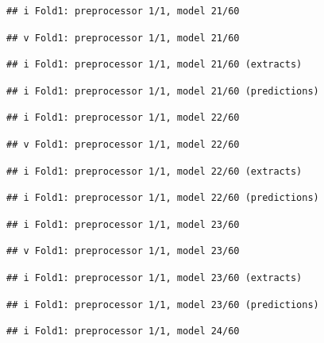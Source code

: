 \documentclass[
]{article}
\begin{document}
\begin{verbatim}
## i Fold1: preprocessor 1/1, model 21/60
\end{verbatim}

\begin{verbatim}
## v Fold1: preprocessor 1/1, model 21/60
\end{verbatim}

\begin{verbatim}
## i Fold1: preprocessor 1/1, model 21/60 (extracts)
\end{verbatim}

\begin{verbatim}
## i Fold1: preprocessor 1/1, model 21/60 (predictions)
\end{verbatim}

\begin{verbatim}
## i Fold1: preprocessor 1/1, model 22/60
\end{verbatim}

\begin{verbatim}
## v Fold1: preprocessor 1/1, model 22/60
\end{verbatim}

\begin{verbatim}
## i Fold1: preprocessor 1/1, model 22/60 (extracts)
\end{verbatim}

\begin{verbatim}
## i Fold1: preprocessor 1/1, model 22/60 (predictions)
\end{verbatim}

\begin{verbatim}
## i Fold1: preprocessor 1/1, model 23/60
\end{verbatim}

\begin{verbatim}
## v Fold1: preprocessor 1/1, model 23/60
\end{verbatim}

\begin{verbatim}
## i Fold1: preprocessor 1/1, model 23/60 (extracts)
\end{verbatim}

\begin{verbatim}
## i Fold1: preprocessor 1/1, model 23/60 (predictions)
\end{verbatim}

\begin{verbatim}
## i Fold1: preprocessor 1/1, model 24/60
\end{verbatim}
\end{document}
